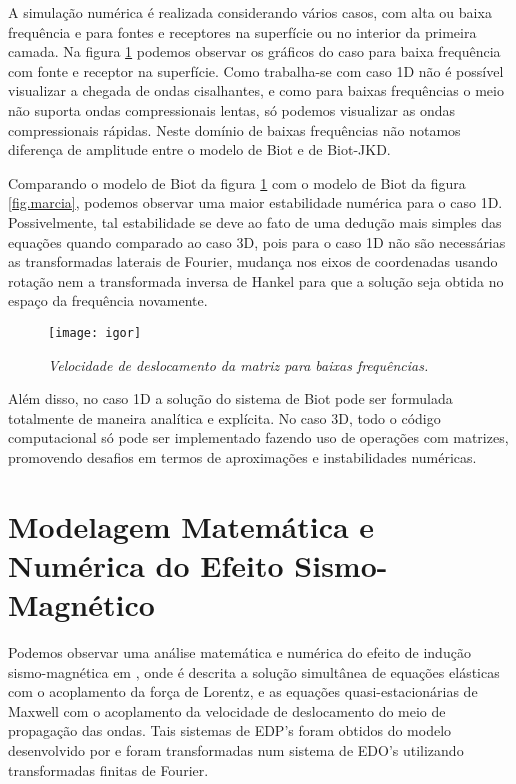 A simula\c{c}\~ao num\'erica \'e realizada considerando v\'arios casos, com alta ou baixa frequ\^encia e para fontes e receptores na superf\'icie ou no interior da primeira camada. Na figura \ref{fig.igor} podemos observar os gr\'aficos do caso para baixa frequ\^encia com fonte e receptor na superf\'icie. Como trabalha-se com caso 1D n\~ao \'e poss\'ivel visualizar a chegada de ondas cisalhantes, e como para baixas frequ\^encias o meio n\~ao suporta ondas compressionais lentas, s\'o podemos visualizar as ondas compressionais r\'apidas. Neste dom\'inio de baixas frequ\^encias n\~ao notamos diferen\c{c}a de amplitude entre o modelo de Biot e de Biot-JKD. 

Comparando o modelo de Biot da figura \ref{fig.igor} com o modelo de Biot da figura \ref{fig.marcia}, podemos observar uma maior estabilidade num\'erica para o caso 1D. Possivelmente, tal estabilidade se deve ao fato de uma dedu\c{c}\~ao mais simples das equa\c{c}\~oes quando comparado ao caso 3D, pois para o caso 1D n\~ao s\~ao necess\'arias as transformadas laterais de Fourier, mudan\c{c}a nos eixos de coordenadas usando rota\c{c}\~ao nem a transformada inversa de Hankel para que a solu\c{c}\~ao seja obtida no espa\c{c}o da frequ\^encia novamente.
\begin{figure}
\centering
\texttt{[image: igor]}
\caption{\textit{Velocidade de deslocamento da matriz para baixas frequ\^encias.}}
\label{fig.igor}
\end{figure}
Al\'em disso, no caso 1D a solu\c{c}\~ao do sistema de Biot pode ser formulada totalmente de maneira anal\'itica e expl\'icita. No caso 3D, todo o c\'odigo computacional s\'o pode ser implementado fazendo uso de opera\c{c}\~oes com matrizes, promovendo desafios em termos de aproxima\c{c}\~oes e instabilidades num\'ericas.


\section{Modelagem Matem\'atica e Num\'erica do Efeito Sismo-Magn\'etico}

Podemos observar uma an\'alise matem\'atica e num\'erica do efeito de indu\c{c}\~ao sismo-magn\'etica em \cite{mikhailenko_97}, onde \'e descrita a solu\c{c}\~ao simult\^anea de equa\c{c}\~oes el\'asticas com o acoplamento da for\c{c}a de Lorentz, e as equa\c{c}\~oes quasi-estacion\'arias de Maxwell com o acoplamento da velocidade de deslocamento do meio de propaga\c{c}\~ao das ondas. Tais sistemas de EDP's foram obtidos do modelo desenvolvido por \cite{Novacki_83} e foram transformadas num sistema de EDO's utilizando transformadas finitas de Fourier.

